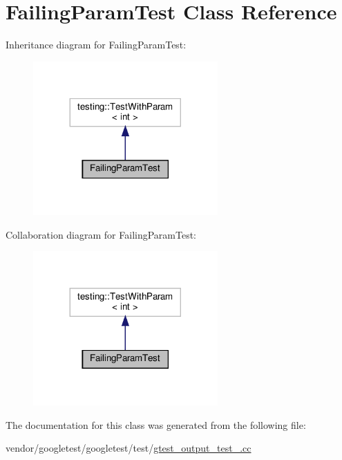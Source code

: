 \hypertarget{class_failing_param_test}{}\section{Failing\+Param\+Test Class Reference}
\label{class_failing_param_test}


Inheritance diagram for Failing\+Param\+Test\+:
\nopagebreak
\begin{figure}[H]
\begin{center}
\leavevmode
\includegraphics[width=200pt]{class_failing_param_test__inherit__graph}
\end{center}
\end{figure}


Collaboration diagram for Failing\+Param\+Test\+:
\nopagebreak
\begin{figure}[H]
\begin{center}
\leavevmode
\includegraphics[width=200pt]{class_failing_param_test__coll__graph}
\end{center}
\end{figure}


The documentation for this class was generated from the following file\+:\begin{DoxyCompactItemize}
\item 
vendor/googletest/googletest/test/\hyperlink{gtest__output__test___8cc}{gtest\+\_\+output\+\_\+test\+\_\+.\+cc}\end{DoxyCompactItemize}
